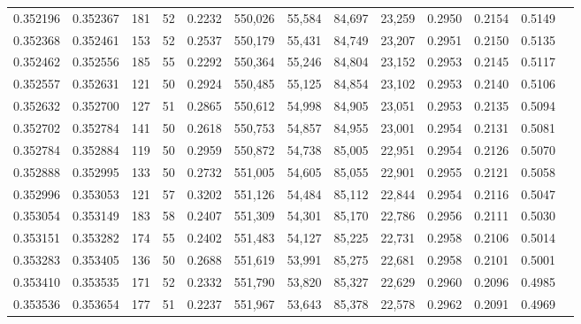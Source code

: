 \begin{tabular}{rrrrrrrrrrrrr}
0.352196 & 0.352367 &   181 &  52 &                                     0.2232 & 550,026 &  55,584 &  84,697 &  23,259 & 0.2950 & 0.2154 & 0.5149 \\
0.352368 & 0.352461 &   153 &  52 &                                     0.2537 & 550,179 &  55,431 &  84,749 &  23,207 & 0.2951 & 0.2150 & 0.5135 \\
0.352462 & 0.352556 &   185 &  55 &                                     0.2292 & 550,364 &  55,246 &  84,804 &  23,152 & 0.2953 & 0.2145 & 0.5117 \\
0.352557 & 0.352631 &   121 &  50 &                                     0.2924 & 550,485 &  55,125 &  84,854 &  23,102 & 0.2953 & 0.2140 & 0.5106 \\
0.352632 & 0.352700 &   127 &  51 &                                     0.2865 & 550,612 &  54,998 &  84,905 &  23,051 & 0.2953 & 0.2135 & 0.5094 \\
0.352702 & 0.352784 &   141 &  50 &                                     0.2618 & 550,753 &  54,857 &  84,955 &  23,001 & 0.2954 & 0.2131 & 0.5081 \\
0.352784 & 0.352884 &   119 &  50 &                                     0.2959 & 550,872 &  54,738 &  85,005 &  22,951 & 0.2954 & 0.2126 & 0.5070 \\
0.352888 & 0.352995 &   133 &  50 &                                     0.2732 & 551,005 &  54,605 &  85,055 &  22,901 & 0.2955 & 0.2121 & 0.5058 \\
0.352996 & 0.353053 &   121 &  57 &                                     0.3202 & 551,126 &  54,484 &  85,112 &  22,844 & 0.2954 & 0.2116 & 0.5047 \\
0.353054 & 0.353149 &   183 &  58 &                                     0.2407 & 551,309 &  54,301 &  85,170 &  22,786 & 0.2956 & 0.2111 & 0.5030 \\
0.353151 & 0.353282 &   174 &  55 &                                     0.2402 & 551,483 &  54,127 &  85,225 &  22,731 & 0.2958 & 0.2106 & 0.5014 \\
0.353283 & 0.353405 &   136 &  50 &                                     0.2688 & 551,619 &  53,991 &  85,275 &  22,681 & 0.2958 & 0.2101 & 0.5001 \\
0.353410 & 0.353535 &   171 &  52 &                                     0.2332 & 551,790 &  53,820 &  85,327 &  22,629 & 0.2960 & 0.2096 & 0.4985 \\
0.353536 & 0.353654 &   177 &  51 &                                     0.2237 & 551,967 &  53,643 &  85,378 &  22,578 & 0.2962 & 0.2091 & 0.4969 \\

\end{tabular}
